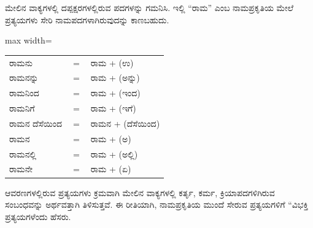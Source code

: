 \indent ಮೇಲಿನ ವಾಕ್ಯಗಳಲ್ಲಿ ದಪ್ಪಕ್ಷರಗಳಲ್ಲಿರುವ ಪದಗಳನ್ನು ಗಮನಿಸಿ. ಇಲ್ಲಿ “ರಾಮ” ಎಂಬ ನಾಮಪ್ರಕೃತಿಯ ಮೇಲೆ ಪ್ರತ್ಯಯಗಳು ಸೇರಿ ನಾಮಪದಗಳಾಗಿರುವುದನ್ನು ಕಾಣಬಹುದು.\par

\begin{kbvderiv}
\vspace{4pt plus 3pt minus 1pt}
\begin{center}\begin{adjustbox}{max width=\textwidth}
{\renewcommand{\arraystretch}{1.22}\setlength{\tabcolsep}{4pt}
\begin{tabular}{l c l}
ರಾಮನು & {\color{kbvgrey}$=$} & ರಾಮ + (ಉ) \\
ರಾಮನನ್ನು & {\color{kbvgrey}$=$} & ರಾಮ + (ಅನ್ನು) \\
ರಾಮನಿಂದ & {\color{kbvgrey}$=$} & ರಾಮ + (ಇಂದ) \\
ರಾಮನಿಗೆ & {\color{kbvgrey}$=$} & ರಾಮ + (ಇಗೆ) \\
ರಾಮನ ದೆಸೆಯಿಂದ & {\color{kbvgrey}$=$} & ರಾಮನ + (ದೆಸೆಯಿಂದ) \\
ರಾಮನ & {\color{kbvgrey}$=$} & ರಾಮ + (ಅ) \\
ರಾಮನಲ್ಲಿ & {\color{kbvgrey}$=$} & ರಾಮ + (ಅಲ್ಲಿ) \\
ರಾಮನೇ & {\color{kbvgrey}$=$} & ರಾಮ + (ಏ) \\
\end{tabular}}
\end{adjustbox}\end{center}
\vspace{4pt plus 3pt minus 1pt}
\end{kbvderiv}

\indent ಆವರಣಗಳಲ್ಲಿರುವ ಪ್ರತ್ಯಯಗಳು ಕ್ರಮವಾಗಿ ಮೇಲಿನ ವಾಕ್ಯಗಳಲ್ಲಿ ಕರ್ತೃ, ಕರ್ಮ, ಕ್ರಿಯಾಪದಗಳಿಗಿರುವ ಸಂಬಂಧವನ್ನು ಅರ್ಥವತ್ತಾಗಿ ತಿಳಿಸುತ್ತವೆ. ಈ ರೀತಿಯಾಗಿ, ನಾಮಪ್ರಕೃತಿಯ ಮುಂದೆ ಸೇರುವ ಪ್ರತ್ಯಯಗಳಿಗೆ “ವಿಭಕ್ತಿ ಪ್ರತ್ಯಯಗಳೆಂದು ಹೆಸರು.\par
